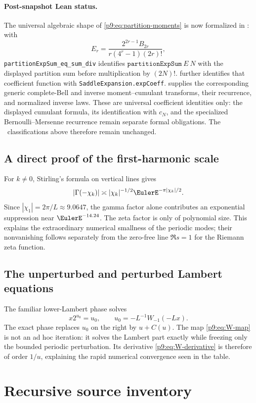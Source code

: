 \documentclass[11pt]{article}
\numberwithin{equation}{section}
\theoremstyle{definition}
\theoremstyle{remark}
\begin{document}
\paragraph{Post-snapshot Lean status.}
The universal algebraic shape of \eqref{p9:eq:partition-moments} is now
formalized in : with
\[
 E_r=\frac{2^{2r-1}B_{2r}}{r(4^r-1)(2r)!},
\]
\nolinkurl{partitionExpSum_eq_sum_div} identifies
\(\texttt{partitionExpSum}\ E\ N\) with the displayed partition sum
before multiplication by \((2N)!\).
 further identifies that coefficient
function with \nolinkurl{SaddleExpansion.expCoeff}.
 supplies the corresponding generic
complete-Bell and inverse moment--cumulant transforms, their recurrence,
and normalized inverse laws.  These are universal coefficient identities
only: the displayed cumulant formula, its identification with \(c_N\),
and the specialized Bernoulli--Mersenne recurrence remain separate formal
obligations.  The \statusN\ classifications above therefore remain unchanged.

\subsection{A direct proof of the first-harmonic scale}
For $k\ne0$, Stirling's formula on vertical lines gives
\[
 |\Gamma(-\chi_k)|\asymp |\chi_k|^{-1/2}\EulerE^{-\pi|\chi_k|/2}.
\]
Since $|\chi_1|=2\pi/L\approx9.0647$, the gamma factor alone contributes an exponential
suppression near $\EulerE^{-14.24}$.  The zeta factor is only of polynomial size.  This explains
the extraordinary numerical smallness of the periodic modes; their nonvanishing follows
separately from the zero-free line $\Re s=1$ for the Riemann zeta function.

\subsection{The unperturbed and perturbed Lambert equations}
The familiar lower-Lambert phase solves
\[
 x2^{u_0}=u_0,
 \qquad
 u_0=-L^{-1}W_{-1}(-Lx).
\]
The exact phase replaces $u_0$ on the right by $u+C(u)$.  The map
\eqref{p9:eq:W-map} is not an ad hoc iteration: it solves the Lambert part exactly while
freezing only the bounded periodic perturbation.  Its derivative
\eqref{p9:eq:W-derivative} is therefore of order $1/u$, explaining the rapid numerical
convergence seen in the table.

\section{Recursive source inventory}
\label{p9:app:inventory}
\end{document}
